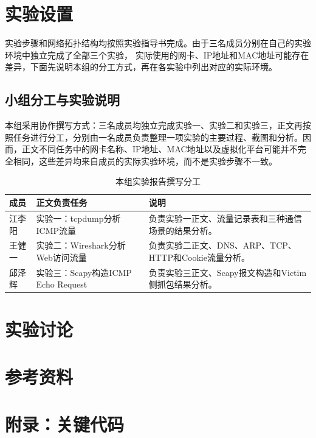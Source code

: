\documentclass{lab1report}
\begin{document}
\makecover



\section{实验设置}
实验步骤和网络拓扑结构均按照实验指导书完成。由于三名成员分别在自己的实验环境中独立完成了全部三个实验，
实际使用的网卡、IP地址和MAC地址可能存在差异，下面先说明本组的分工方式，再在各实验中列出对应的实际环境。

\subsection{小组分工与实验说明}

本组采用协作撰写方式：三名成员均独立完成实验一、实验二和实验三，正文再按照任务进行分工，分别由一名成员负责整理一项实验的主要过程、截图和分析。因而，正文不同任务中的网卡名称、IP地址、MAC地址以及虚拟化平台可能并不完全相同，这些差异均来自成员的实际实验环境，而不是实验步骤不一致。

\begin{table}[H]
    \centering
    \caption{本组实验报告撰写分工}
    \label{tab:group-division}
    \renewcommand{\arraystretch}{1.35}
    \begin{tabularx}{\linewidth}{>{\raggedright\arraybackslash}p{3.0cm} >{\raggedright\arraybackslash}p{3.2cm} X}
        \toprule
        成员 & 正文负责任务 & 说明 \\
        \midrule
        江李阳 & 实验一：tcpdump分析ICMP流量 & 负责实验一正文、流量记录表和三种通信场景的结果分析。 \\
        王健一 & 实验二：Wireshark分析Web访问流量 & 负责实验二正文、DNS、ARP、TCP、HTTP和Cookie流量分析。 \\
        邱泽辉 & 实验三：Scapy构造ICMP Echo Request & 负责实验三正文、Scapy报文构造和Victim侧抓包结果分析。 \\
        \bottomrule
    \end{tabularx}
\end{table}





\section{实验讨论}

\section{参考资料}
\printbibliography[heading=none]

\newpage
\appendix
\section{附录：关键代码}

\end{document}
